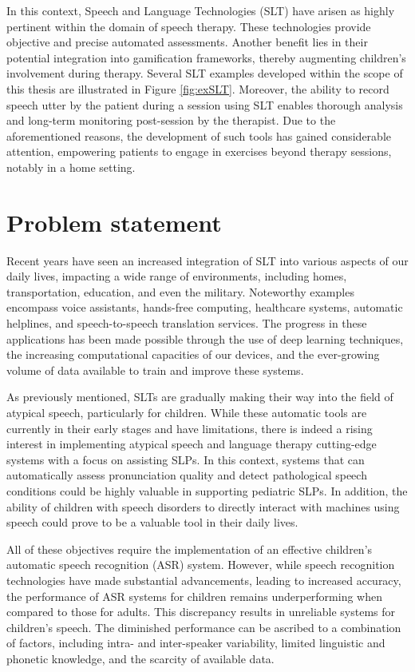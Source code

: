 In this context, Speech and Language Technologies (SLT) have arisen as highly pertinent within the domain of speech therapy. These technologies provide objective and precise automated assessments. Another benefit lies in their potential integration into gamification frameworks, thereby augmenting children's involvement during therapy. Several SLT examples developed within the scope of this thesis are illustrated in Figure \ref{fig:exSLT}. Moreover, the ability to record speech utter by the patient during a session using SLT enables thorough analysis and long-term monitoring post-session by the therapist. Due to the aforementioned reasons, the development of such tools has gained considerable attention, empowering patients to engage in exercises beyond therapy sessions, notably in a home setting.

\section{Problem statement}
Recent years have seen an increased integration of SLT into various aspects of our daily lives, impacting a wide range of environments, including homes, transportation, education, and even the military. Noteworthy examples encompass voice assistants, hands-free computing, healthcare systems, automatic helplines, and speech-to-speech translation services. The progress in these applications has been made possible through the use of deep learning techniques, the increasing computational capacities of our devices, and the ever-growing volume of data available to train and improve these systems.

As previously mentioned, SLTs are gradually making their way into the field of atypical speech, particularly for children. While these automatic tools are currently in their early stages and have limitations, there is indeed a rising interest in implementing atypical speech and language therapy cutting-edge systems with a focus on assisting SLPs. In this context, systems that can automatically assess pronunciation quality and detect pathological speech conditions could be highly valuable in supporting pediatric SLPs. In addition, the ability of children with speech disorders to directly interact with machines using speech could prove to be a valuable tool in their daily lives.

All of these objectives require the implementation of an effective children's automatic speech recognition (ASR) system. However, while speech recognition technologies have made substantial advancements, leading to increased accuracy, the performance of ASR systems for children remains underperforming when compared to those for adults. This discrepancy results in unreliable systems for children's speech. The diminished performance can be ascribed to a combination of factors, including intra- and inter-speaker variability, limited linguistic and phonetic knowledge, and the scarcity of available data.


